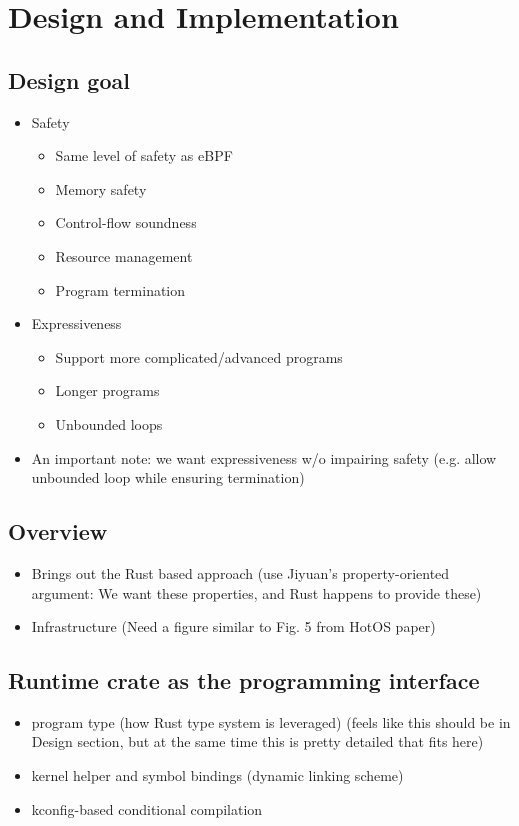 \section{Design and Implementation}

\subsection{Design goal}
\begin{itemize}
    \item Safety
        \begin{itemize}
            \item Same level of safety as eBPF
            \item Memory safety
            \item Control-flow soundness
            \item Resource management
            \item Program termination
        \end{itemize}
    \item Expressiveness
        \begin{itemize}
            \item Support more complicated/advanced programs
            \item Longer programs
            \item Unbounded loops
        \end{itemize}
    \item An important note: we want expressiveness w/o impairing safety (e.g.
        allow unbounded loop while ensuring termination)
\end{itemize}

\subsection{Overview}
\begin{itemize}
    \item Brings out the Rust based approach (use Jiyuan's property-oriented
        argument: We want these properties, and Rust happens to provide these)
    \item Infrastructure (Need a figure similar to Fig. 5 from HotOS paper)
\end{itemize}

\subsection{Runtime crate as the programming interface}
\begin{itemize}
    \item program type (how Rust type system is leveraged) (feels like this
        should be in Design section, but at the same time this is pretty
        detailed that fits here)
    \item kernel helper and symbol bindings (dynamic linking scheme)
    \item kconfig-based conditional compilation
\end{itemize}

